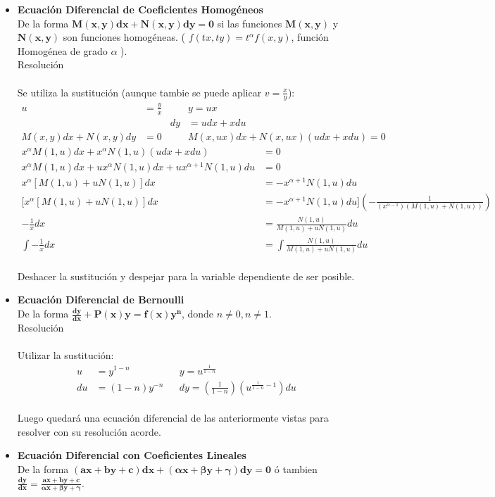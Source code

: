 \documentclass{article}
\begin{document}
\begin{itemize}
    \item \textbf{Ecuación Diferencial de Coeficientes Homogéneos} \\
    De la forma $\boldsymbol{M(x,y)dx + N(x,y)dy = 0}$ 
    si las funciones $\boldsymbol{M(x,y)}$ y $\boldsymbol{N(x,y)}$  son 
    funciones homogéneas. ( $f(tx,ty) = t^{\alpha}f(x,y)$, función Homogénea 
    de grado $\alpha$ ). \\
    Resolución \\
    \\Se utiliza la sustitución (aunque tambie se puede aplicar $v=\frac{x}{y}$): \\
    \begin{align*}
        u & = \frac{y}{x} && y = ux\\
        && dy & = udx + xdu \\
        M(x,y)dx + N(x,y)dy &= 0 && M(x,ux)dx + N(x,ux)(udx +xdu) = 0
    \end{align*}
    \begin{align*}
        x^{\alpha} M(1,u)dx + x^{\alpha} N(1,u)(udx + xdu) & = 0 \\
        x^{\alpha} M(1,u)dx + ux^{\alpha} N(1,u)dx + ux^{\alpha+1} N(1,u)du & = 0 \\
        x^{\alpha} [ M(1,u) + uN(1,u) ]dx & = -x^{\alpha+1}N(1,u)du \\
        [ x^{\alpha} [ M(1,u) + uN(1,u) ]dx & = -x^{\alpha+1}N(1,u)du ] (-\frac{1}{(x^{\alpha-1})(M(1,u)+N(1,u))}) \\
        -\frac{1}{x} dx & = \frac{N(1,u)}{M(1,u) + uN(1,u)}du \\
        \int -\frac{1}{x} dx & = \int \frac{N(1,u)}{M(1,u) + uN(1,u)}du
    \end{align*}
    \\Deshacer la sustitución y despejar para la variable dependiente de ser posible.\\

    \item \textbf{Ecuación Diferencial de Bernoulli} \\
    De la forma $\boldsymbol{\frac{dy}{dx} + P(x)y = f(x)y^n}$, donde 
    $n \neq 0, n \neq 1$. \\
    Resolución \\
    \\ Utilizar la sustitución: \\
    \begin{align*}
        u & = y^{1-n} && y = u^{\frac{1}{1-n}} \\
        du & = (1-n)y^{-n} && dy = (\frac{1}{1-n})(u^{\frac{1}{1-n}-1})du
    \end{align*}
    \\Luego quedará una ecuación diferencial de las anteriormente vistas para resolver con 
    su resolución acorde.

    \item \textbf{Ecuación Diferencial con Coeficientes Lineales} \\
    De la forma $\boldsymbol{ (ax + by + c)dx + (\alpha x + \beta y + \gamma )dy = 0 }$ ó tambien 
    $\boldsymbol{ \frac{dy}{dx} = \frac{ax + by + c}{\alpha x + \beta y + \gamma } }$.
\end{itemize}
\end{document}
